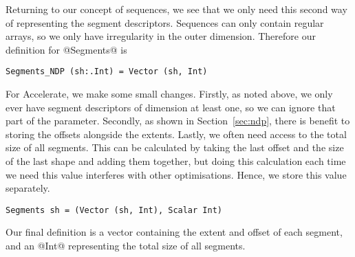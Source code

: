 Returning to our concept of sequences, we see that we only need this second way of representing the segment descriptors. Sequences can only contain regular arrays, so we only have irregularity in the outer dimension. Therefore our definition for @Segments@ is
%
\begin{lstlisting}[style=ndp]
Segments_NDP (sh:.Int) = Vector (sh, Int)
\end{lstlisting}
%
For Accelerate, we make some small changes. Firstly, as noted above, we only ever have segment descriptors of dimension at least one, so we can ignore that part of the parameter. Secondly, as shown in Section~\ref{sec:ndp}, there is benefit to storing the offsets alongside the extents. Lastly, we often need access to the total size of all segments. This can be calculated by taking the last offset and the size of the last shape and adding them together, but doing this calculation each time we need this value interferes with other optimisations. Hence, we store this value separately.
%
\begin{lstlisting}[style=ndp]
Segments sh = (Vector (sh, Int), Scalar Int)
\end{lstlisting}
%
Our final definition is a vector containing the extent and offset of each segment, and an @Int@ representing the total size of all segments.




%
%

